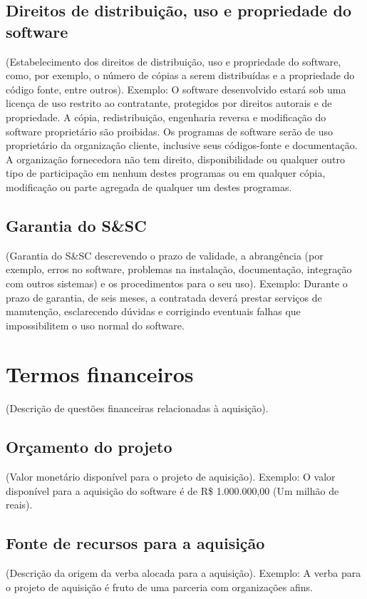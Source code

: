 \subsection{Direitos de distribuição, uso e propriedade do software}
(Estabelecimento dos direitos de distribuição, uso e propriedade do
software, como, por exemplo, o número de cópias a serem distribuídas e a
propriedade do código fonte, entre outros).
Exemplo: O software desenvolvido estará sob uma licença de uso restrito ao
contratante, protegidos por direitos autorais e de propriedade. A cópia,
redistribuição, engenharia reversa e modificação do software proprietário são
proibidas. Os programas de software serão de uso proprietário da
organização cliente, inclusive seus códigos-fonte e documentação. A
organização fornecedora não tem direito, disponibilidade ou qualquer outro
tipo de participação em nenhum destes programas ou em qualquer cópia,
modificação ou parte agregada de qualquer um destes programas.

\subsection{Garantia do S\&SC}
(Garantia do S\&SC descrevendo o prazo de validade, a abrangência
(por exemplo, erros no software, problemas na instalação, documentação,
integração com outros sistemas) e os procedimentos para o seu uso).
Exemplo: Durante o prazo de garantia, de seis meses, a contratada deverá
prestar serviços de manutenção, esclarecendo dúvidas e corrigindo eventuais
falhas que impossibilitem o uso normal do software.

\section{Termos financeiros}
(Descrição de questões financeiras relacionadas à aquisição).

\subsection{Orçamento do projeto}
(Valor monetário disponível para o projeto de aquisição).
Exemplo: O valor disponível para a aquisição do software é de R\$
1.000.000,00 (Um milhão de reais).

\subsection{Fonte de recursos para a aquisição}
(Descrição da origem da verba alocada para a aquisição).
Exemplo: A verba para o projeto de aquisição é fruto de uma parceria com
organizações afins.

